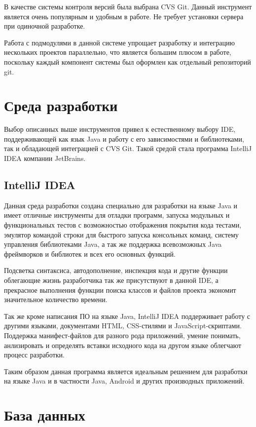 В качестве системы контроля версий была выбрана CVS Git. Данный инструмент является очень популярным и удобным в работе. Не требует установки сервера при одиночной разработке.

Работа с подмодулями в данной системе упрощает разработку и интеграцию нескольких проектов параллельно, что является большим плюсом в работе, поскольку каждый компонент системы был оформлен как отдельный репозиторий git.


\section{Среда разработки}
Выбор описанных выше инструментов привел к естественному выбору IDE, поддерживающей как язык Java и работу с его зависимостями и библиотеками, так и обладающей интеграцией с CVS Git. Такой средой стала программа IntelliJ IDEA компании JetBrains. 
\subsection{IntelliJ IDEA}

Данная среда разработки создана специально для разработки на языке Java и имеет отличные инструменты для отладки программ, запуска модульных и функциональных тестов с возможностью отображения покрытия кода тестами, эмулятор командой строки для быстрого запуска консольных команд, систему управления библиотеками Java, а так же поддержка всевозможных Java фреймворков и библиотек и всех его основных функций. 

Подсветка синтаксиса, автодополнение, инспекция кода и другие функции облегающие жизнь разработчика так же присутствуют в данной IDE, а прекрасное выполнения функции поиска классов и файлов проекта экономит значительное количество времени.

Так же кроме написания ПО на языке Java, IntelliJ IDEA поддерживает работу с другими языками, документами HTML, CSS-стилями и JavaScript-скриптами. Поддержка манифест-файлов для разного рода приложений, умение понимать, анлизировать и определять вставки исходного кода на другом языке облегчают процесс разработки.

Таким образом данная программа является идеальным решением для разработки на языке Java и в частности Java, Android и других производных приложений.

\section{База данных}
